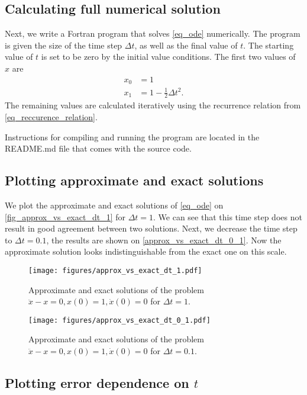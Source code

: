\subsection{Calculating full numerical solution}


Next, we write a Fortran program that solves \autoref{eq_ode} numerically. The program is given the size of the time step $\Delta t$, as well as the final value of $t$. The starting value of $t$ is set to be zero by the initial value conditions. The first two values of $x$ are
\begin{align*}
  x_0 &= 1 \\
  x_1 &= 1 - \frac{1}{2} \Delta t^2.
\end{align*}
The remaining values are calculated iteratively using the recurrence relation from \autoref{eq_reccurence_relation}.


Instructions for compiling and running the program are located in the README.md file that comes with the source code.


\subsection{Plotting approximate and exact solutions}

We plot the approximate and exact solutions of \autoref{eq_ode} on \autoref{fig_approx_vs_exact_dt_1} for $\Delta t = 1$. We can see that this time step does not result in good agreement between two solutions. Next, we decrease the time step to $\Delta t = 0.1$, the results are shown on \autoref{approx_vs_exact_dt_0_1}. Now the approximate solution looks indistinguishable from the exact one on this scale.
\begin{figure}[H]
  \centering
  \texttt{[image: figures/approx\_vs\_exact\_dt\_1.pdf]}
  \caption{Approximate and exact solutions of the problem $\ddot{x} - x = 0, x(0)=1, \dot{x}(0)=0$ for $\Delta t = 1$.}
  \label{fig_approx_vs_exact_dt_1}
\end{figure}
\begin{figure}[H]
  \centering
  \texttt{[image: figures/approx\_vs\_exact\_dt\_0\_1.pdf]}
  \caption{Approximate and exact solutions of the problem $\ddot{x} - x = 0, x(0)=1, \dot{x}(0)=0$ for $\Delta t = 0.1$.}
  \label{approx_vs_exact_dt_0_1}
\end{figure}


\subsection{Plotting error dependence on $t$}

